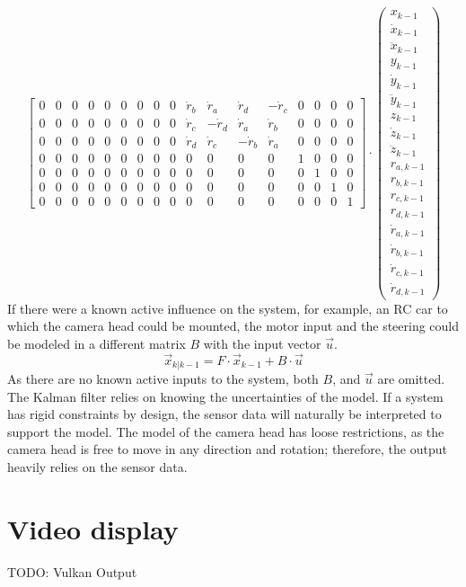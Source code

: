\begin{equation*}
\begin{bmatrix}
        0 & 0 & 0 & 0 & 0 & 0 & 0 & 0 & 0 & \dot{r}_{b} &  \dot{r}_{a} &  \dot{r}_{d} & -\dot{r}_{c} & 0 & 0 & 0 & 0 \\
        0 & 0 & 0 & 0 & 0 & 0 & 0 & 0 & 0 & \dot{r}_{c} & -\dot{r}_{d} &  \dot{r}_{a} &  \dot{r}_{b} & 0 & 0 & 0 & 0 \\
        0 & 0 & 0 & 0 & 0 & 0 & 0 & 0 & 0 & \dot{r}_{d} &  \dot{r}_{c} & -\dot{r}_{b} &  \dot{r}_{a} & 0 & 0 & 0 & 0 \\
        0 & 0 & 0 & 0 & 0 & 0 & 0 & 0 & 0 & 0 & 0 & 0 & 0 & 1 & 0 & 0 & 0 \\
        0 & 0 & 0 & 0 & 0 & 0 & 0 & 0 & 0 & 0 & 0 & 0 & 0 & 0 & 1 & 0 & 0 \\
        0 & 0 & 0 & 0 & 0 & 0 & 0 & 0 & 0 & 0 & 0 & 0 & 0 & 0 & 0 & 1 & 0 \\
        0 & 0 & 0 & 0 & 0 & 0 & 0 & 0 & 0 & 0 & 0 & 0 & 0 & 0 & 0 & 0 & 1
    \end{bmatrix} 
    \cdot 
    \begin{pmatrix}
        x_{k-1}\\
        \dot{x}_{k-1}\\
        \ddot{x}_{k-1}\\
        y_{k-1}\\
        \dot{y}_{k-1}\\
        \ddot{y}_{k-1}\\
        z_{k-1}\\
        \dot{z}_{k-1}\\
        \ddot{z}_{k-1}\\
        r_{a,k-1}\\
        r_{b,k-1}\\
        r_{c,k-1}\\
        r_{d,k-1}\\
        \dot{r}_{a,k-1}\\
        \dot{r}_{b,k-1}\\
        \dot{r}_{c,k-1}\\
        \dot{r}_{d,k-1}
    \end{pmatrix}
\end{equation*}
If there were a known active influence on the system, for example, an RC car to which the camera head could be mounted, the motor input and the steering could be modeled in a different matrix $B$ with the input vector $\vec{u}$.
\begin{equation*}
    \vec{x}_{k|k-1} = 
    F
    \cdot
    \vec{x}_{k-1}
    +
    B
    \cdot
    \vec{u}
\end{equation*}
As there are no known active inputs to the system, both $B$, and $\vec{u}$ are omitted.\\
The Kalman filter relies on knowing the uncertainties of the model. If a system has rigid constraints by design, the sensor data will naturally be interpreted to support the model. The model of the camera head has loose restrictions, as the camera head is free to move in any direction and rotation; therefore, the output heavily relies on the sensor data. 
\section{Video display}
\label{sec:VideoDisplay}
TODO: Vulkan Output